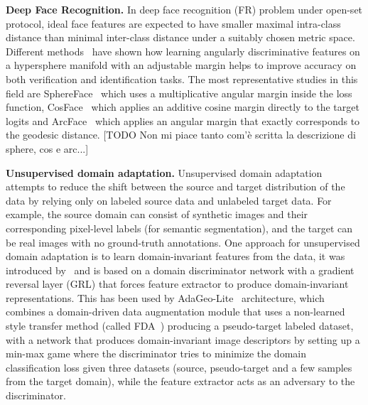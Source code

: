 \documentclass[10pt,twocolumn,letterpaper]{article}
\begin{document}
\textbf{Deep Face Recognition.}
In deep face recognition (FR) problem under open-set protocol, ideal face features are expected to have smaller maximal intra-class distance than minimal inter-class distance under a suitably chosen metric space. Different methods~\cite{sphereface, cosface, arcface} have shown how learning angularly discriminative features on a hypersphere manifold with an adjustable margin helps to improve accuracy on both verification and identification tasks. The most representative studies in this field are SphereFace~\cite{sphereface} which uses a multiplicative angular margin inside the loss function, CosFace~\cite{cosface} which applies an additive cosine margin directly to the target logits and ArcFace~\cite{arcface} which applies an angular margin that exactly corresponds to the geodesic distance. [TODO Non mi piace tanto com'è scritta la descrizione di sphere, cos e arc...]
\newline

\textbf{Unsupervised domain adaptation.}
Unsupervised domain adaptation attempts to reduce the shift between the source and target distribution of the data by relying only on labeled source data and unlabeled target data. For example, the source domain can consist of synthetic images and their corresponding pixel-level labels (\eg for semantic segmentation), and the target can be real images with no ground-truth annotations. One approach for unsupervised domain adaptation is to learn domain-invariant features from the data, it was introduced by~\cite{grl} and is based on a domain discriminator network with a gradient reversal layer (GRL) that forces feature extractor to produce domain-invariant representations. This has been used by AdaGeo-Lite~\cite{adageo} architecture, which combines a domain-driven data augmentation module that uses a non-learned style transfer method (called FDA~\cite{fda}) producing a pseudo-target labeled dataset, with a network that produces domain-invariant image descriptors by setting up a min-max game where the discriminator tries to minimize the domain classification loss given three datasets (source, pseudo-target and a few samples from the target domain), while the feature extractor acts as an adversary to the discriminator.



\end{document}
